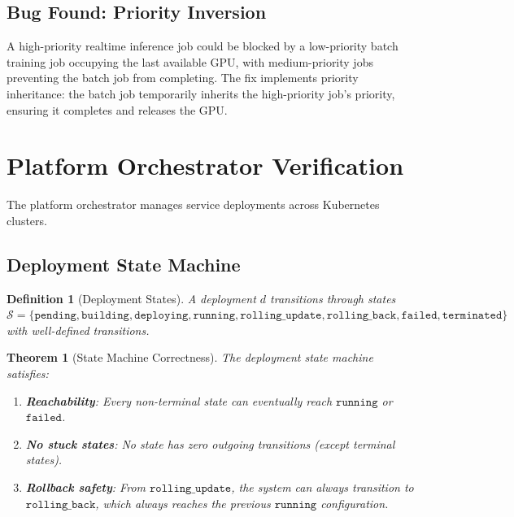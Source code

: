 \documentclass[11pt]{article}
\newtheorem{theorem}{Theorem}
\newtheorem{definition}{Definition}
\begin{document}
\subsection{Bug Found: Priority Inversion}

A high-priority realtime inference job could be blocked by a low-priority
batch training job occupying the last available GPU, with medium-priority jobs
preventing the batch job from completing. The fix implements priority
inheritance: the batch job temporarily inherits the high-priority job's
priority, ensuring it completes and releases the GPU.

\section{Platform Orchestrator Verification}
\label{sec:platform}

The platform orchestrator manages service deployments across Kubernetes
clusters.

\subsection{Deployment State Machine}

\begin{definition}[Deployment States]
A deployment $d$ transitions through states $\mathcal{S} = \{
\texttt{pending}, \texttt{building}, \texttt{deploying}, \texttt{running},
\texttt{rolling\_update}, \texttt{rolling\_back}, \texttt{failed},
\texttt{terminated}\}$ with well-defined transitions.
\end{definition}

\begin{theorem}[State Machine Correctness]
The deployment state machine satisfies:
\begin{enumerate}[leftmargin=1.4em]
    \item \textbf{Reachability}: Every non-terminal state can eventually reach
    $\texttt{running}$ or $\texttt{failed}$.
    \item \textbf{No stuck states}: No state has zero outgoing transitions
    (except terminal states).
    \item \textbf{Rollback safety}: From $\texttt{rolling\_update}$, the system
    can always transition to $\texttt{rolling\_back}$, which always reaches
    the previous $\texttt{running}$ configuration.
\end{enumerate}
\end{theorem}
\end{document}
